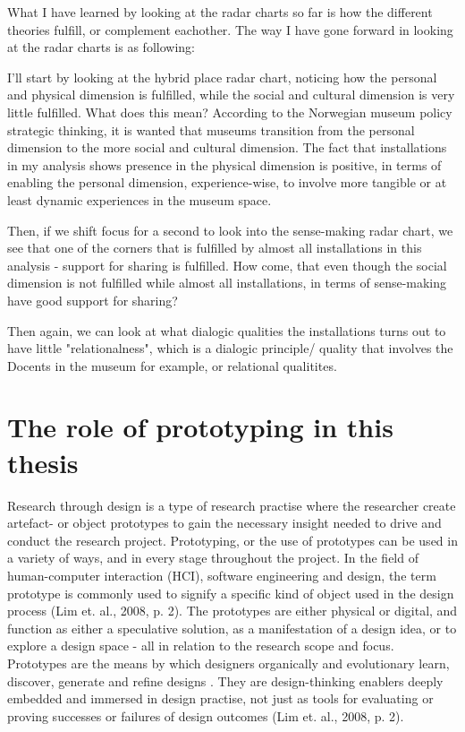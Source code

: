 What I have learned by looking at the radar charts so far is how the different theories fulfill, or complement eachother. The way I have gone forward in looking at the radar charts is as following:
\par I'll start by looking at the hybrid place radar chart, noticing how the personal and physical dimension is fulfilled, while the social and cultural dimension is very little fulfilled. What does this mean? According to the Norwegian museum policy strategic thinking, it is wanted that museums transition from the personal dimension to the more social and cultural dimension. The fact that installations in my analysis shows presence in the physical dimension is positive, in terms of enabling the personal dimension, experience-wise, to involve more tangible or at least dynamic experiences in the museum space.
\par Then, if we shift focus for a second to look into the sense-making radar chart, we see that one of the corners that is fulfilled by almost all installations in this analysis - support for sharing is fulfilled. How come, that even though the social dimension is not fulfilled while almost all installations, in terms of sense-making have good support for sharing? 

\par Then again, we can look at what dialogic qualities the installations turns out to have little "relationalness", which is a dialogic principle/ quality that involves the Docents in the museum for example, or relational qualitites.









\section{The role of prototyping in this thesis}
Research through design is a type of research practise where the researcher create artefact- or object prototypes to gain the necessary insight needed to drive and conduct the research project. Prototyping, or the use of prototypes can be used in a variety of ways, and in every stage throughout the project. In the field of human-computer interaction (HCI), software engineering and design, the term prototype is commonly used to signify a specific kind of object used in the design process (Lim et. al., 2008, p. 2). The prototypes are either physical or digital, and function as either a speculative solution, as a manifestation of a design idea, or to explore a design space - all in relation to the research scope and focus. Prototypes are the means by which designers organically and evolutionary learn, discover, generate and refine designs \cite{lim_anatomy_2008, p.2}. They are design-thinking enablers deeply embedded and immersed in design practise, not just as tools for evaluating or proving successes or failures of design outcomes (Lim et. al., 2008, p. 2).

